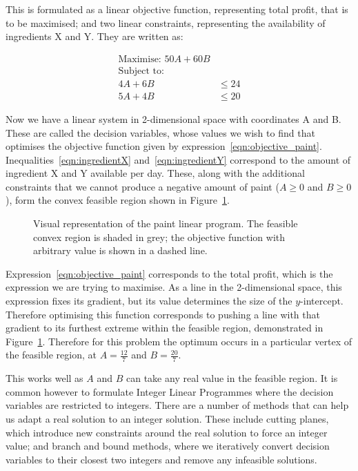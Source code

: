 This is formulated as a linear objective function, representing total profit,
that is to be maximised; and two linear constraints, representing the
availability of ingredients X and Y. They are written as:

\begin{align}
\text{Maximise: } 50 A + 60 B & \label{eqn:objective_paint} \\
\text{Subject to: } & \nonumber \\
4 A + 6 B &\leq 24 \label{eqn:ingredientX} \\
5 A + 4 B &\leq 20 \label{eqn:ingredientY}
\end{align}

Now we have a linear system in 2-dimensional space with coordinates A and B.
These are called the decision variables, whose values we wish to find that
optimises the objective function given by expression~\ref{eqn:objective_paint}.
Inequalities~\ref{eqn:ingredientX} and~\ref{eqn:ingredientY} correspond to the
amount of ingredient X and Y available per day. These, along with the additional
constraints that we cannot produce a negative amount of paint
($A \geq 0$ and $B \geq 0$), form the convex feasible region shown in
Figure~\ref{fig:paint_lp}.

\begin{figure}
\begin{center}

\end{center}
\caption{Visual representation of the paint linear program. The feasible convex
region is shaded in grey; the objective function with arbitrary value is shown
in a dashed line.}
\label{fig:paint_lp}
\end{figure}

Expression~\ref{eqn:objective_paint} corresponds to the total profit, which is
the expression we are trying to maximise. As a line in the 2-dimensional space,
this expression fixes its gradient, but its value determines the size of the
$y$-intercept. Therefore optimising this function corresponds to pushing a line
with that gradient to its furthest extreme within the feasible region,
demonstrated in Figure~\ref{fig:paint_lp}.
Therefore for this problem the optimum occurs in a particular vertex of the
feasible region, at $A = \frac{12}{7}$ and $B = \frac{20}{7}$.

This works well as $A$ and $B$ can take any real value in the feasible region.
It is common however to formulate Integer Linear Programmes where the decision
variables are restricted to integers. There are a number of methods that can
help us adapt a real solution to an integer solution. These include cutting
planes, which introduce new constraints around the real solution to force an
integer value; and branch and bound methods, where we iteratively convert
decision variables to their closest two integers and remove any infeasible
solutions.

